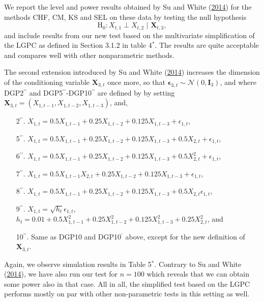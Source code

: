 \documentclass[
  12pt,
  letterpaper]{article}
\providecommand{\tightlist}{%
  \setlength{\itemsep}{0pt}\setlength{\parskip}{0pt}}
\numberwithin{equation}{section}
\newcommand{\X}{\bm{X}}
\newcommand{\fepsilon}{\bm{\epsilon}}
\begin{document}
We report the level and power results obtained by Su and White (\protect\hyperlink{ref-su2014testing}{2014}) for the methods CHF, CM, KS and SEL on these data by testing the null hypothesis
\[\textrm{H}_0: X_{t,1} \perp X_{t,2} \,\, | \,\, \X_{t,3},\]
and include results from our new test based on the multivariate simplification of the LGPC as defined in Section 3.1.2 in table 4\(^*\). The results are quite acceptable and compares well with other nonparametric methods.

The second extension introduced by Su and White (\protect\hyperlink{ref-su2014testing}{2014}) increases the dimension of the conditioning variable \(\X_{3,t}\) once more, so that \(\fepsilon_{3,t} \sim \mathcal{N}(0, \bm{I}_3)\), and where DGP2\(^{\prime\prime}\) and DGP5\(^{\prime\prime}\)-DGP10\(^{\prime\prime}\) are defined by by setting \(\X_{3,t} = (X_{1, t-1}, X_{1, t-2}, X_{1, t-3})\), and,

\begin{itemize}
\tightlist
\item[2$^{\prime\prime}$.] $X_{1,t} = 0.5X_{1,t-1} + 0.25X_{1, t-2} + 0.125X_{1,t-3} + \epsilon_{1,t}$,
\item[5$^{\prime\prime}$.] $X_{1,t} = 0.5X_{1,t-1} + 0.25X_{1, t-2} + 0.125X_{1,t-3} + 0.5X_{2,t} + \epsilon_{1,t}$,
\item[6$^{\prime\prime}$.] $X_{1,t} = 0.5X_{1,t-1} + 0.25X_{1, t-2} + 0.125X_{1,t-3} + 0.5X_{2,t}^2 + \epsilon_{1,t}$,
\item[7$^{\prime\prime}$.] $X_{1,t} = 0.5X_{1,t-1}X_{2, t} + 0.25X_{1,t-2} + 0.125X_{1,t-3} + \epsilon_{1,t}$,
\item[8$^{\prime\prime}$.] $X_{1,t} = 0.5X_{1,t-1} + 0.25X_{1,t-2} + 0.125X_{1,t-3} + 0.5X_{2, t}\epsilon_{1,t}$,
\item[9$^{\prime\prime}$.] $X_{1,t} = \sqrt{h_t}\epsilon_{1,t}$, $h_t = 0.01 + 0.5X_{1,t-1}^2 + 0.25X_{1,t-2}^2 + 0.125X_{1,t-3}^2 + 0.25X_{2,t}^2$, and
\item[10$^{\prime\prime}$.] Same as DGP10 and DGP10$^{\prime}$ above, except for the new definition of $\X_{3,t}$.
\end{itemize}



Again, we observe simulation results in Table 5\(^*\). Contrary to Su and White (\protect\hyperlink{ref-su2014testing}{2014}), we have also run our test for \(n=100\) which reveals that we can obtain some power also in that case. All in all, the simplified test based on the LGPC performs mostly on par with other non-parametric tests in this setting as well.
\end{document}
